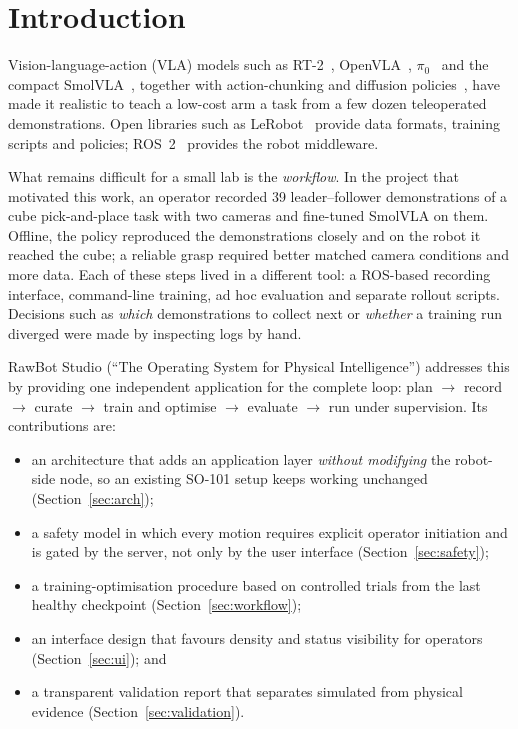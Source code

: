 \documentclass[conference]{IEEEtran}
\begin{document}
\section{Introduction}
Vision-language-action (VLA) models such as RT-2~\cite{rt2}, OpenVLA~\cite{openvla},
$\pi_0$~\cite{pi0} and the compact SmolVLA~\cite{smolvla}, together with action-chunking and
diffusion policies~\cite{act,diffusion}, have made it realistic to teach a low-cost arm a
task from a few dozen teleoperated demonstrations. Open libraries such as
LeRobot~\cite{lerobot} provide data formats, training scripts and policies; ROS~2~\cite{ros2}
provides the robot middleware.

What remains difficult for a small lab is the \emph{workflow}. In the project that motivated
this work, an operator recorded 39 leader--follower demonstrations of a cube pick-and-place
task with two cameras and fine-tuned SmolVLA on them. Offline, the policy reproduced the
demonstrations closely and on the robot it reached the cube; a reliable grasp required better
matched camera conditions and more data. Each of these steps lived in a different tool: a
ROS-based recording interface, command-line training, ad hoc evaluation and separate rollout
scripts. Decisions such as \emph{which} demonstrations to collect next or \emph{whether} a
training run diverged were made by inspecting logs by hand.

RawBot Studio (``The Operating System for Physical Intelligence'') addresses this by providing one
independent application for the complete loop: plan $\rightarrow$ record $\rightarrow$ curate
$\rightarrow$ train and optimise $\rightarrow$ evaluate $\rightarrow$ run under supervision. Its
contributions are:
\begin{itemize}
\item an architecture that adds an application layer \emph{without modifying} the robot-side
node, so an existing SO-101 setup keeps working unchanged (Section~\ref{sec:arch});
\item a safety model in which every motion requires explicit operator initiation and is gated by
the server, not only by the user interface (Section~\ref{sec:safety});
\item a training-optimisation procedure based on controlled trials from the last healthy
checkpoint (Section~\ref{sec:workflow});
\item an interface design that favours density and status visibility for operators
(Section~\ref{sec:ui}); and
\item a transparent validation report that separates simulated from physical evidence
(Section~\ref{sec:validation}).
\end{itemize}
\end{document}
